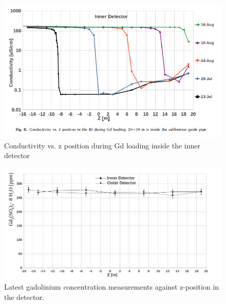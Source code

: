 \begin{figure}[H]
    \includegraphics[width=\textwidth]{Figures/gd_conductivity.png}
    \caption{Conductivity vs. z position during Gd loading inside the inner detector}
    \label{fig:gdconductivity}
\end{figure}


\begin{figure}[H]
    \includegraphics[width=\textwidth]{Figures/gdconcentration.png}
    \caption{Latest gadolinium concentration measurements against z-position in the detector.}
    \label{fig:gdconcentration}
\end{figure}

